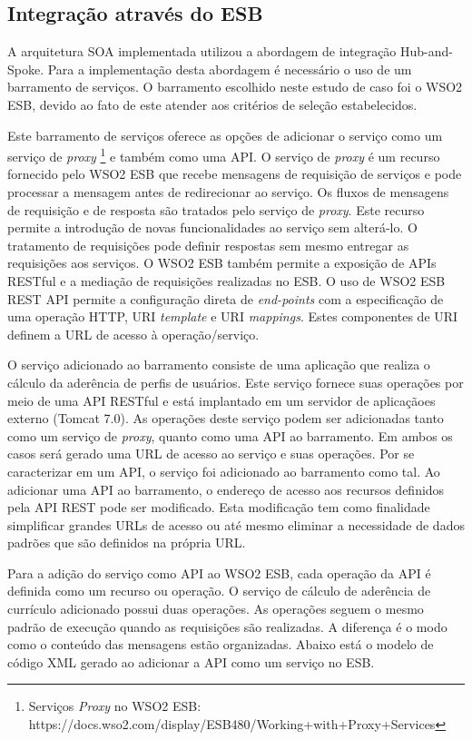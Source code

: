 \subsection{Integração através do ESB}
A arquitetura SOA implementada utilizou a abordagem de integração Hub-and-Spoke. Para a implementação desta abordagem é necessário o uso de um barramento de serviços. O barramento escolhido neste estudo de caso foi o WSO2 ESB, devido ao fato de este atender aos critérios de seleção estabelecidos. 

Este barramento de serviços oferece as opções de adicionar o serviço como um serviço de \textit{proxy} \footnote{Serviços \textit{Proxy} no WSO2 ESB: https://docs.wso2.com/display/ESB480/Working+with+Proxy+Services} e também como uma API. O serviço de \textit{proxy} é um recurso fornecido pelo WSO2 ESB que recebe mensagens de requisição de serviços e pode processar a mensagem antes de redirecionar ao serviço. Os fluxos de mensagens de requisição e de resposta são tratados pelo serviço de \textit{proxy}. Este recurso permite a introdução de novas funcionalidades ao serviço sem alterá-lo. O tratamento de requisições pode definir respostas sem mesmo entregar as requisições aos serviços. O WSO2 ESB também permite a exposição de APIs RESTful e a mediação de requisições realizadas no ESB. O uso de WSO2 ESB REST API permite a configuração direta de \textit{end-points} com a especificação de uma operação HTTP, URI \textit{template} e URI \textit{mappings}. Estes componentes de URI definem a URL de acesso à operação/serviço.

O serviço adicionado ao barramento consiste de uma aplicação que realiza o cálculo da aderência de perfis de usuários. Este serviço fornece suas operações por meio de uma API RESTful e está implantado em um servidor de aplicaçãoes externo (Tomcat 7.0). As operações deste serviço podem ser adicionadas tanto como um serviço de \textit{proxy}, quanto como uma API ao barramento. Em ambos os casos será gerado uma URL de acesso ao serviço e suas operações. Por se caracterizar em um API, o serviço foi adicionado ao barramento como tal. Ao adicionar uma API ao barramento, o endereço de acesso aos recursos definidos pela API REST pode ser modificado. Esta modificação tem como finalidade simplificar grandes URLs de acesso ou até mesmo eliminar a necessidade de dados padrões que são definidos na própria URL.

Para a adição do serviço como API ao WSO2 ESB, cada operação da API é definida como um recurso ou operação. O serviço de cálculo de aderência de currículo adicionado possui duas operações. As operações seguem o mesmo padrão de execução quando as requisições são realizadas. A diferença é o modo como o conteúdo das mensagens estão organizadas. Abaixo está o modelo de código XML gerado ao adicionar a API como um serviço no ESB.

